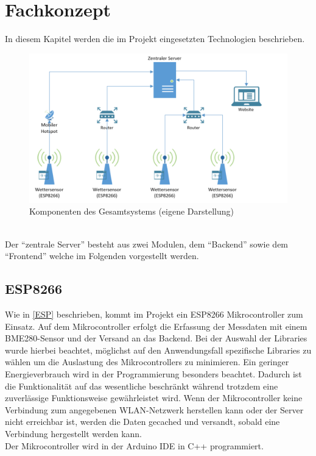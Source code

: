 \section{Fachkonzept}
In diesem Kapitel werden die im Projekt eingesetzten Technologien beschrieben.\\
\begin{figure}[h]
    \centering
    \includegraphics[width=0.7\linewidth]{img/projektkomponenten}
    \caption[Komponenten des Gesamtsystems]{Komponenten des Gesamtsystems (eigene Darstellung)}
    \label{fig:projektkomponenten}
\end{figure}
\\
Der \enquote{zentrale Server} besteht aus zwei Modulen, dem \enquote{Backend} sowie dem \enquote{Frontend} welche im Folgenden vorgestellt werden.
\subsection{ESP8266}
Wie in \autoref{ESP} beschrieben, kommt im Projekt ein ESP8266 Mikrocontroller zum Einsatz.
Auf dem Mikrocontroller erfolgt die Erfassung der Messdaten mit einem BME280-Sensor und der Versand an das Backend.
Bei der Auswahl der Libraries wurde hierbei beachtet, möglichst auf den Anwendungsfall spezifische Libraries zu wählen um die Auslastung des Mikrocontrollers zu minimieren.
Ein geringer Energieverbrauch wird in der Programmierung besonders beachtet.
Dadurch ist die Funktionalität auf das wesentliche beschränkt während trotzdem eine zuverlässige Funktionsweise gewährleistet wird.
Wenn der Mikrocontroller keine Verbindung zum angegebenen WLAN-Netzwerk herstellen kann oder der Server nicht erreichbar ist, werden die Daten gecached und versandt, sobald eine Verbindung hergestellt werden kann.\\
Der Mikrocontroller wird in der Arduino IDE in C++ programmiert.

